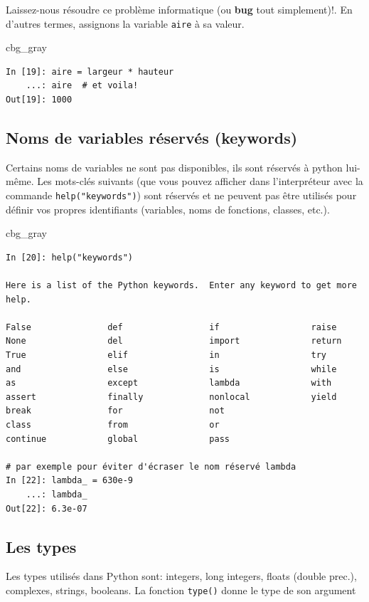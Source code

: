 \documentclass[%
oneside,                 %
final,                   %
10pt]{article}
\newenvironment{_cod_tight}[1]{
   \def\FrameCommand{\colorbox{#1}}
   \FrameRule0.6pt\MakeFramed {\FrameRestore}\vskip3mm}
   {\vskip0mm\endMakeFramed}
\newenvironment{cod}[1]{
\bgroup\rmfamily
\fboxsep=0mm\relax
\begin{_cod_tight}{#1}
\list{}{\parsep=-2mm\parskip=0mm\topsep=0pt\leftmargin=2mm
\rightmargin=2\leftmargin\leftmargin=4pt\relax}
\item\relax}
{\endlist\end{_cod_tight}\egroup}
\begin{document}
Laissez-nous résoudre ce problème informatique (ou \textbf{bug} tout simplement)!. En d'autres termes, assignons la variable \texttt{aire} à sa valeur.

\begin{cod}{cbg_gray}\begin{verbatim}
In [19]: aire = largeur * hauteur
    ...: aire  # et voila!
Out[19]: 1000
\end{verbatim}
\end{cod}
\noindent

\subsection{Noms de variables réservés (keywords)}
Certains noms de variables ne sont pas disponibles, ils sont réservés à python lui-même. Les mots-clés suivants (que vous pouvez afficher dans l'interpréteur avec la commande \texttt{help("keywords")}) sont réservés et ne peuvent pas être utilisés pour définir vos propres identifiants (variables, noms de fonctions, classes, etc.).

\begin{cod}{cbg_gray}\begin{verbatim}
In [20]: help("keywords")

Here is a list of the Python keywords.  Enter any keyword to get more help.

False               def                 if                  raise
None                del                 import              return
True                elif                in                  try
and                 else                is                  while
as                  except              lambda              with
assert              finally             nonlocal            yield
break               for                 not
class               from                or
continue            global              pass

# par exemple pour éviter d'écraser le nom réservé lambda
In [22]: lambda_ = 630e-9
    ...: lambda_
Out[22]: 6.3e-07
\end{verbatim}
\end{cod}
\noindent

\subsection{Les types}
Les types utilisés dans Python sont: integers, long integers, floats (double prec.), complexes, strings, booleans. La fonction \texttt{type()} donne le type de son argument
\end{document}
